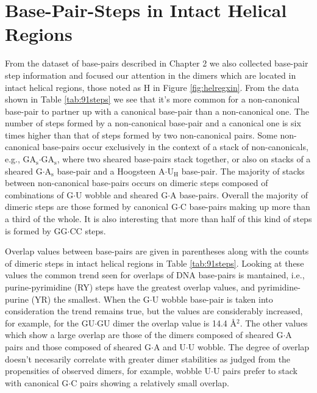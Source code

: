 \section{Base-Pair-Steps in Intact Helical Regions}
From  the  dataset  of  base-pairs  described in  Chapter  2  we  also
collected base-pair step information  and focused our attention in the
dimers which are  located in intact helical regions,  those noted as H
in  Figure   \ref{fig:helregxin}.   From  the  data   shown  in  Table
\ref{tab:91steps}  we see that  it's more  common for  a non-canonical
base-pair   to  partner  up   with  a   canonical  base-pair   than  a
non-canonical  one.  The  number of  steps formed  by  a non-canonical
base-pair and a  canonical one is six times higher  than that of steps
formed  by  two non-canonical  pairs.   Some non-canonical  base-pairs
occur exclusively in  the context of a stack  of non-canonicals, e.g.,
GA$_{\text{s}}$$\cdot$GA$_{\text{s}}$,  where  two sheared  base-pairs
stack together, or also  on stacks of a sheared G$\cdot$A$_{\text{s}}$
base-pair  and  a  Hoogsteen  A$\cdot$U$_{\text{H}}$  base-pair.   The
majority of stacks between  non-canonical base-pairs occurs on dimeric
steps  composed  of  combinations  of  G$\cdot$U  wobble  and  sheared
G$\cdot$A base-pairs.  Overall the majority of dimeric steps are those
formed by canonical  G$\cdot$C base-pairs making up more  than a third
of the whole.  It is also interesting that more than half of this kind
of steps is formed by GG$\cdot$CC steps.

Overlap values between base-pairs  are given in parentheses along with
the  counts  of dimeric  steps  in  intact  helical regions  in  Table
\ref{tab:91steps}. Looking  at these values the common  trend seen for
overlaps of DNA base-pairs  is mantained, i.e., purine-pyrimidine (RY)
steps have the greatest overlap values, and pyrimidine-purine (YR) the
smallest.   When   the  G$\cdot$U  wobble  base-pair   is  taken  into
consideration the trend remains  true, but the values are considerably
increased, for example, for the GU$\cdot$GU dimer the overlap value is
14.4 \AA$^{\text{2}}$.   The other values  which show a  large overlap
are those of the dimers  composed of sheared G$\cdot$A pairs and those
composed  of sheared G$\cdot$A  and U$\cdot$U  wobble.  The  degree of
overlap doesn't necesarily correlate with greater dimer stabilities as
judged from  the propensities of observed dimers,  for example, wobble
U$\cdot$U pairs prefer to stack with canonical G$\cdot$C pairs showing
a relatively small overlap.

